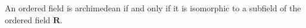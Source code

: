 An ordered field is archimedean if and only if it is isomorphic to a subfield of the ordered field $\mathbf{R}$.
